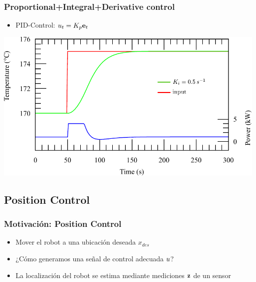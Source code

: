\begin{frame}
    \frametitle{Proportional+Integral+Derivative control}
    
    \begin{itemize}
        \item PID-Control: $u_{t} = K_{p} \boldsymbol{\mathbf{e}}_{t}$
    \end{itemize}
    
    \begin{center}
        \includegraphics[width=0.8\columnwidth]{images/pid_control_integral.pdf}
    \end{center}
    
    
\end{frame}

\subsection{Position Control}

\begin{frame}
    \frametitle{Motivación: Position Control}
    
    \begin{itemize}
        \item Mover el robot a una ubicación deseada $x_{des}$
        \item ¿Cómo generamos una señal de control adecuada $u$?
        \item La localización del robot se estima mediante mediciones $\boldsymbol{\mathbf{z}}$ de un sensor
    \end{itemize}
    
\end{frame}

